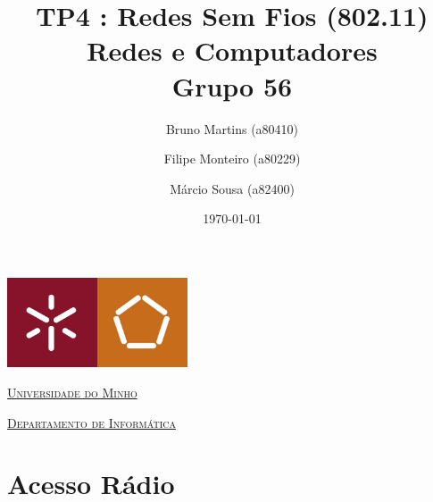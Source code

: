 \documentclass[a4paper]{article}
\begin{document}
\title{TP4 : Redes Sem Fios (802.11)\\ Redes e Computadores\\Grupo 56}
\author{Bruno Martins (a80410) \and Filipe Monteiro (a80229) \and Márcio Sousa (a82400)}
\date{\today}

\begin{titlepage}

  \thispagestyle{empty}
  \begin{center}
  \begin{minipage}{0.75\linewidth}
      \centering
     \includegraphics[width=0.4\textwidth]{pics/eng.jpeg}\par\vspace{1cm}
      \vspace{1.5cm}
      \href{https://www.uminho.pt/PT}{\scshape\LARGE Universidade do Minho} \par
      \vspace{1cm}
      \href{https://www.di.uminho.pt/}{\scshape\Large Departamento de Informática} \par
      \vspace{1.5cm}

  \maketitle
  \end{minipage}
  \end{center}

  \vspace{2cm}

  


  \clearpage

 \end{titlepage}
 \tableofcontents
 \newpage
 
 \section{Acesso Rádio}
\end{document}
